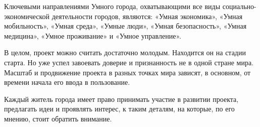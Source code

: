 Ключевыми направлениями Умного города, охватывающими все виды социально-экономической деятельности городов, являются: «Умная экономика», «Умная мобильность», «Умная среда», «Умные люди», «Умная безопасность», «Умная медицина», «Умное проживание» и «Умное управление». 

В целом, проект можно считать достаточно молодым. Находится он на стадии старта. Но уже успел завоевать доверие и признанность не в одной стране мира. Масштаб и продвижение проекта в разных точках мира зависят, в основном, от времени начала его ввода в пользование. 

Каждый житель города имеет право принимать участие в развитии проекта, предлагать идеи и проявлять интерес, к таким деталям, на которые, по его мнению, стоит обратить внимание. 